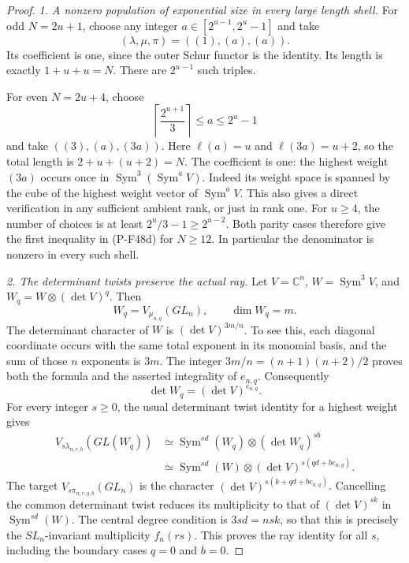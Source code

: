 \documentclass[11pt,a4paper]{article}
\begin{document}
\begin{proof}
\emph{1. A nonzero population of exponential size in every
large length shell.}
For odd $N=2u+1$, choose any integer
$a\in[2^{u-1},2^u-1]$ and take
\[
                         (\lambda,\mu,\pi)=((1),(a),(a)).
\]
Its coefficient is one, since the outer Schur functor is
the identity. Its length is exactly $1+u+u=N$.
There are $2^{u-1}$ such triples.

For even $N=2u+4$, choose
\[
                    \left\lceil\frac{2^{u+1}}3\right\rceil
                              \le a\le 2^u-1
\]
and take $((3),(a),(3a))$. Here $\ell(a)=u$ and
$\ell(3a)=u+2$, so the total length is $2+u+(u+2)=N$.
The coefficient is one: the highest weight $(3a)$ occurs
once in $\operatorname{Sym}^3(\operatorname{Sym}^a V)$.
Indeed its weight space is spanned by the cube of the
highest weight vector of $\operatorname{Sym}^a V$.
This also gives a direct verification in any sufficient
ambient rank, or just in rank one.
For $u\ge4$, the number of choices is at least
$2^u/3-1\ge2^{u-2}$.
Both parity cases therefore give the first inequality in
(P-F48d) for $N\ge12$. In particular the denominator is
nonzero in every such shell.

\emph{2. The determinant twists preserve the actual ray.}
Let $V=\mathbb C^n$, $W=\operatorname{Sym}^3 V$, and
$W_q=W\otimes(\det V)^q$. Then
\[
              W_q=V_{\mu_{n,q}}(GL_n),\qquad \dim W_q=m.
\]
The determinant character of $W$ is
$(\det V)^{3m/n}$. To see this, each diagonal coordinate
occurs with the same total exponent in its monomial
basis, and the sum of those $n$ exponents is $3m$.
The integer $3m/n=(n+1)(n+2)/2$ proves both the formula
and the asserted integrality of $e_{n,q}$.
Consequently
\[
                    \det W_q=(\det V)^{e_{n,q}}.
\]
For every integer $s\ge0$, the usual determinant twist
identity for a highest weight gives
\[
 \begin{split}
 V_{s\lambda_{n,r,b}}(GL(W_q))
   &\simeq \operatorname{Sym}^{sd}(W_q)
                          \otimes(\det W_q)^{sb}\\
   &\simeq \operatorname{Sym}^{sd}(W)
                    \otimes(\det V)^{s(qd+be_{n,q})}.
 \end{split}
 \tag{P-F48e}
\]
The target $V_{s\pi_{n,r,q,b}}(GL_n)$ is the character
$(\det V)^{s(k+qd+be_{n,q})}$. Cancelling the common
determinant twist reduces its multiplicity to that of
$(\det V)^{sk}$ in $\operatorname{Sym}^{sd}(W)$.
The central degree condition is $3sd=nsk$, so that
this is precisely the $SL_n$-invariant multiplicity
$f_n(rs)$. This proves the ray identity for all $s$,
including the boundary cases $q=0$ and $b=0$.


\end{proof}
\end{document}
